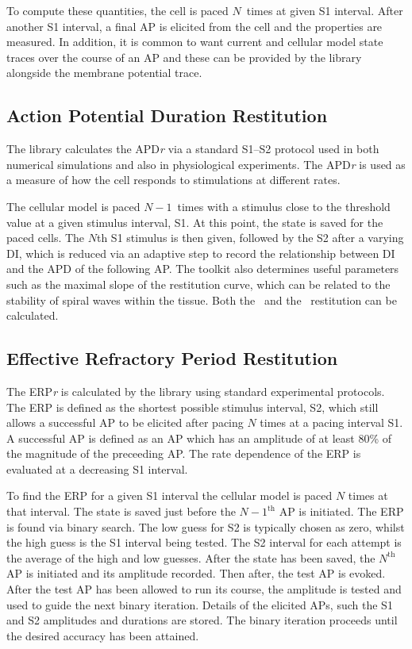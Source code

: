 To compute these quantities, the cell is paced $N$\ times at given S1 interval.
After another S1 interval, a final AP is elicited from the cell and the
properties are measured.  In addition, it is common to want current and
cellular model state traces over the course of an AP and these can be provided
by the library alongside the membrane potential trace.

\subsection{Action Potential Duration Restitution}

The library calculates the APD\emph{r} via a standard S1--S2 protocol used in both
numerical simulations and also in physiological experiments.  The APD\emph{r} is used
as a measure of how the cell responds to stimulations at different rates.

The cellular model is paced $N-1$\ times with a stimulus close to the threshold
value at a given stimulus interval, S1.  At this point, the state is saved for the
paced cells.  The $N$th S1 stimulus is then given, followed by the S2 after a
varying DI, which is reduced via an adaptive step to record the relationship
between DI and the APD of the following AP.  The toolkit also determines useful
parameters such as the maximal slope of the restitution curve, which can be
related to the stability of spiral waves within the tissue.  Both the \apdr\ and
the \apdr[50]\ restitution can be calculated.

\subsection{Effective Refractory Period Restitution}

The ERP\emph{r} is calculated by the library using standard experimental protocols.
The ERP is defined as the shortest possible stimulus interval, S2, which still
allows a successful AP to be elicited after pacing $N$ times at a pacing
interval S1.  A successful AP is defined as an AP which has an amplitude
of at least 80\% of the magnitude of the preceeding AP.  
The rate dependence of the ERP is evaluated at a decreasing S1 interval.

To find the ERP for a given S1 interval the cellular model is paced $N$ times
at that interval.
The state is saved just before the $N-1^{\text{th}}$ AP is initiated.
The ERP is found via binary search.
The low guess for S2 is typically chosen as zero, whilst the high guess is the
S1 interval being tested.
The S2 interval for each attempt is the average of the high and low guesses.
After the state has been saved, the $N^{\text{th}}$ AP is initiated and its
amplitude recorded.
Then  after, the test AP is evoked.
After the test AP has been allowed to run its course, the amplitude is tested
and used to guide the next binary iteration.
Details of the elicited APs, such the S1 and S2 amplitudes and durations are
stored.
The binary iteration proceeds until the desired accuracy has been attained.

